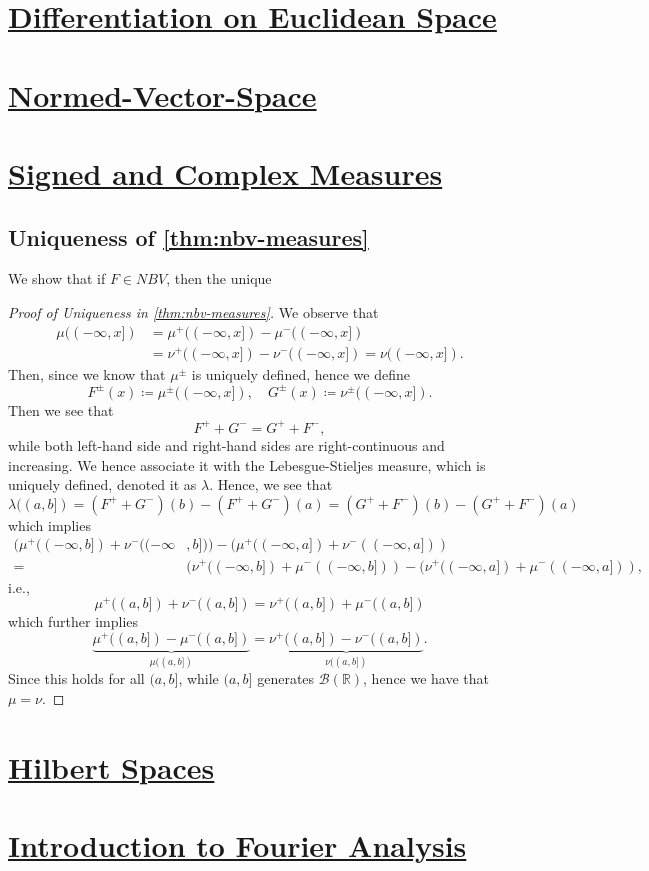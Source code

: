 \section{\hyperref[ch:Differentiation-on-Euclidean-Space]{Differentiation on Euclidean Space}}

\section{\hyperref[ch:Normed-Vector-Space]{Normed-Vector-Space}}

\section{\hyperref[ch:Signed-and-Complex-Measures]{Signed and Complex Measures}}
\subsection{Uniqueness of \autoref{thm:nbv-measures}}\label{pf:thm:nbv-measures-uniqueness}
\begin{claim}
	We show that if \(F\in NBV\), then the unique
\end{claim}
\begin{proof}[Proof of Uniqueness in \autoref{thm:nbv-measures}]
	We observe that
	\[
		\begin{split}
			\mu ((-\infty , x]) & = \mu^+ ((-\infty , x]) - \mu ^- ((-\infty , x])                       \\
			                    & = \nu ^+((-\infty , x]) - \nu ^-((-\infty , x]) = \nu ((-\infty , x]).
		\end{split}
	\]
	Then, since we know that \(\mu ^\pm\) is uniquely defined, hence we define
	\[
		F^\pm (x) \coloneqq  \mu ^\pm ((-\infty , x]),\quad G^\pm (x) \coloneqq \nu ^\pm ((-\infty , x]).
	\]
	Then we see that
	\[
		F^+ + G^- = G^+ + F^-,
	\]
	while both left-hand side and right-hand sides are right-continuous and increasing. We hence associate it with the Lebesgue-Stieljes measure, which is
	uniquely defined, denoted it as \(\lambda \). Hence, we see that
	\[
		\lambda ((a, b]) = (F^+ + G^-)(b) - (F^+ + G^-)(a) = (G^+ + F^-)(b) - (G^+ + F^-)(a)
	\]
	which implies
	\[
		\begin{split}
			(\mu ^+((-\infty , b]) + \nu ^-((-\infty & , b])) - (\mu ^+((-\infty , a]) + \nu ^-((-\infty , a]))                                           \\
			=                                        & (\nu ^+((-\infty , b]) + \mu ^-((-\infty , b])) - (\nu ^+((-\infty , a]) + \mu ^-((-\infty , a])),
		\end{split}
	\]
	i.e.,
	\[
		\mu ^+((a, b]) + \nu ^-((a, b]) = \nu ^+((a, b]) + \mu ^-((a, b])
	\]
	which further implies
	\[
		\underbrace{\mu ^+((a, b]) - \mu ^-((a, b])}_{\mu ((a, b])} = \underbrace{\nu ^+((a, b]) - \nu ^-((a, b])}_{\nu ((a, b])}.
	\]
	Since this holds for all \((a, b]\), while \((a, b]\) generates \(\mathcal{B} (\mathbb{R} )\), hence
	we have that \(\mu = \nu \).
\end{proof}
\section{\hyperref[ch:Hilbert-Spaces]{Hilbert Spaces}}

\section{\hyperref[ch:Introduction-to-Fourier-Analysis]{Introduction to Fourier Analysis}}